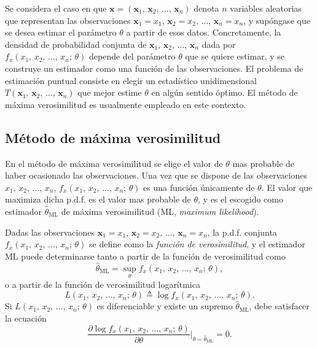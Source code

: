 \documentclass[a4paper]{report}
\newcommand{\x}{\mathbf{x}}
\begin{document}
Se considera el caso en que \(\x=(\x_1,\,\x_2,\,\dots,\,\x_n)\) denota \(n\) variables aleatorias que representan las observaciones \(\x_1=x_1,\,\x_2=x_2,\,\dots,\,\x_n=x_n\), y supóngase que se desea estimar el parámetro \(\theta\) a partir de esos datos. Concretamente, la densidad de probabilidad conjunta de \(\x_1,\,\x_2,\,\dots,\,\x_n\) dada por \(f_x(x_1,\,x_2,\,\dots,\,x_n;\,\theta)\) depende del parámetro \(\theta\) que se quiere estimar, y se construye un estimador como una función de las observaciones. El problema de estimación puntual consiste en elegir un estadístico unidimensional \(T(\x_1,\,\x_2,\,\dots,\,\x_n)\) que mejor estime \(\theta\) en algún sentido óptimo. El método de máxima verosimilitud es usualmente empleado en este contexto.

\subsection{Método de máxima verosimilitud}

En el método de máxima verosimilitud se elige el valor de \(\theta\) mas probable de haber ocasionado las observaciones. Una vez que se dispone de las observaciones \(x_1,\,x_2,\,\dots,\,x_n\), \(f_x(x_1,\,x_2,\,\dots,\,x_n;\,\theta)\) es una función únicamente de \(\theta\). El valor que maximiza dicha p.d.f. es el valor mas probable de \(\theta\), y es el escogido como estimador \(\hat{\theta}_\textrm{ML}\) de máxima verosimilitud (ML, \emph{maximum likelihood}).

Dadas las observaciones \(\x_1=x_1,\,\x_2=x_2,\,\dots,\,\x_n=x_n\), la p.d.f. conjunta \(f_x(x_1,\,x_2,\,\dots,\,x_n;\,\theta)\) se define como la \emph{función de verosimilitud}, y el estimador ML puede determinarse tanto a partir de la función de verosimilitud como
\begin{equation}\label{eq:mle_definition}
 \hat{\theta}_\textrm{ML}=\sup_\theta f_x(x_1,\,x_2,\,\dots,\,x_n;\,\theta), 
\end{equation}
o a partir de la función de verosimilitud logarítmica
\[
 L(x_1,\,x_2,\,\dots,\,x_n;\,\theta)\triangleq\log f_x(x_1,\,x_2,\,\dots,\,x_n;\,\theta).
\]
Si \(L(x_1,\,x_2,\,\dots,\,x_n;\,\theta)\) es diferenciable y existe un supremo \(\hat{\theta}_\textrm{ML}\), debe satisfacer la ecuación
\[
 \frac{\partial\log f_x(x_1,\,x_2,\,\dots,\,x_n;\,\theta)}{\partial\theta}\bigg|_{\theta=\hat{\theta}_\textrm{ML}}=0.
\]
\end{document}
